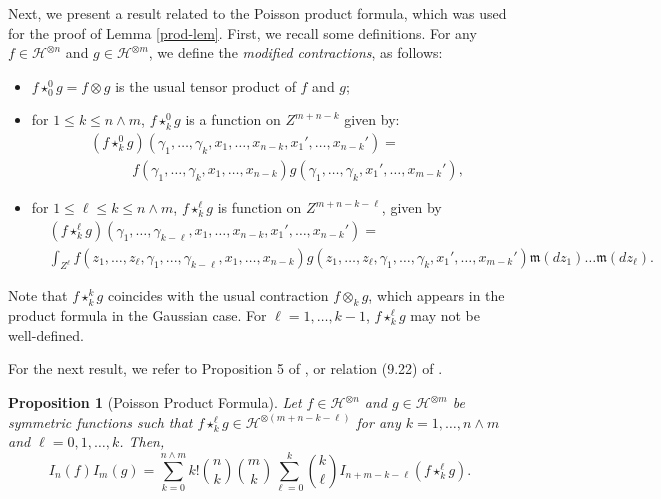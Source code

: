 \documentclass[12pt]{article}
\newtheorem{proposition}[theorem]{Proposition}
\def\cH{\mathcal{H}}
\newcommand{\fm}{\mathfrak{m}}
\begin{document}
Next, we present a result related to the Poisson product formula, which was used for the proof of Lemma \ref{prod-lem}. First, we recall some definitions. For any $f \in \cH^{\otimes n}$ and $g \in \cH^{\otimes m}$, we define the {\em modified contractions}, as follows:
\begin{itemize}
\item[(i)]
 $f\star^0_0 g = f\otimes g$ is the usual tensor product of $f$
and $g$;

\item[(ii)]
 for $1\leq k\leq n\wedge m$,   $f\star^0_k g$ is a  function
on $Z^{m+n-k}$ given by:
\begin{align*}
& (f \star^0_k g)(\gamma_1,\ldots,\gamma_k,x_1,\ldots,x_{n-k},x_1',\ldots,x_{n-k}')=\\
& \quad \quad \quad 
f(\gamma_1, \ldots, \gamma_k,  x_1, \ldots , x_{n-k})  g(\gamma_1, \ldots, \gamma_k, x_1', \ldots , x_{m-k}'),
\end{align*}

\item[(iii)]
for $1\leq \ell \leq k \leq n\wedge m$, $f\star^\ell_k g$ is  function
on $Z^{m+n-k-\ell}$, given by
\begin{align*}
& (f \star^{\ell}_k g) (\gamma_1,\ldots,\gamma_{k-\ell},x_1,\ldots,x_{n-k},x_1',\ldots,x_{n-k}')=\\
& \int_{Z^{\ell}} f(z_1,\ldots,z_{\ell},\gamma_1, ... , \gamma_{k-\ell},  x_1, \ldots, x_{n-k})  g(z_1,\ldots,z_{\ell},\gamma_1, \ldots, \gamma_k, x_1', \ldots , x_{m-k}')\fm(dz_1)\ldots \fm(dz_{\ell}).
\end{align*}
\end{itemize}

Note that  $f \star^{k}_k g$ coincides with the usual contraction $f \otimes_k g$, which appears in the product formula in the Gaussian case. For $\ell=1,\ldots,k-1$, 
$f \star^{\ell}_k g$ may not be well-defined. 

For the next result, we refer to Proposition 5 %
of \cite{Last16}, or relation (9.22) of \cite{NN18}.

\begin{proposition}[Poisson Product Formula]
\label{prop:prod}
Let $f \in \cH^{\otimes n}$ and $g \in \cH^{\otimes m}$ be symmetric functions such that
$f \star_{k}^{\ell} g\in \cH^{\otimes (m+n-k-\ell)}$
for any $k=1,\ldots, n\wedge m$ and $\ell=0,1,\ldots,k$.
Then,
\[
I_n(f) I_m(g)
= \sum_{k=0}^{n\wedge m}k! \binom{n}{k}\binom{m}{k}\sum_{\ell=0}^{k}\binom{k}{\ell}I_{n+m-k-\ell}(f \star_{k}^{\ell} g ).
\]
\end{proposition} 
\end{document}
